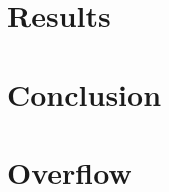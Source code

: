 \documentclass[12pt, a4paper]{report}
\begin{document}
\chapter{Results}

\chapter{Conclusion}

\appendix
\chapter{Overflow}

\sloppy
\printbibliography %

\end{document}
